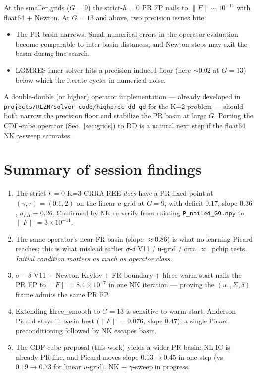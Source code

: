\documentclass[11pt]{article}
\begin{document}
At the smaller grids ($G=9$) the strict-$h{=}0$ PR FP nails to $\|F\|\sim 10^{-11}$
with float64 + Newton. At $G=13$ and above, two precision issues bite:

\begin{itemize}
\item The PR basin narrows. Small numerical errors in the operator evaluation
become comparable to inter-basin distances, and Newton steps may exit the
basin during line search.
\item LGMRES inner solver hits a precision-induced floor (here $\sim 0.02$ at
$G=13$) below which the iterate cycles in numerical noise.
\end{itemize}

A double-double (or higher) operator implementation --- already developed in
\texttt{projects/REZN/solver\_code/highprec\_dd\_qd} for the K=2 problem ---
should both narrow the precision floor and stabilize the PR basin at large
$G$. Porting the CDF-cube operator (Sec.~\ref{sec:grids}) to DD is a natural
next step if the float64 NK $\gamma$-sweep saturates.

\section{Summary of session findings}
\begin{enumerate}
\item The strict-$h{=}0$ K=3 CRRA REE \emph{does} have a PR fixed point at
$(\gamma,\tau){=}(0.1,2)$ on the linear $u$-grid at $G=9$, with deficit $0.17$,
slope $0.36$, $d_{FR}=0.26$. Confirmed by NK re-verify from existing
\texttt{P\_nailed\_G9.npy} to $\|F\|=3\!\times\!10^{-11}$.
\item The same operator's near-FR basin (slope $\approx 0.86$) is what
no-learning Picard reaches; this is what mislead earlier $\sigma$-$\delta$ V11 / u-grid /
crra\_xi\_pchip tests. \emph{Initial condition matters as much as operator class.}
\item $\sigma{-}\delta$ V11 + Newton-Krylov + FR boundary + hfree warm-start
nails the PR FP to $\|F\|=8.4\!\times\!10^{-7}$ in one NK iteration --- proving
the $(u_1,\Sigma,\delta)$ frame admits the same PR FP.
\item Extending hfree\_smooth to $G=13$ is sensitive to warm-start. Anderson
Picard stays in basin best ($\|F\|=0.076$, slope $0.47$); a single Picard
preconditioning followed by NK escapes basin.
\item The CDF-cube proposal (this work) yields a wider PR basin: NL IC is
already PR-like, and Picard moves slope $0.13\!\to\!0.45$ in one step
(vs $0.19\!\to\!0.73$ for linear $u$-grid). NK + $\gamma$-sweep in progress.
\end{enumerate}
\end{document}
